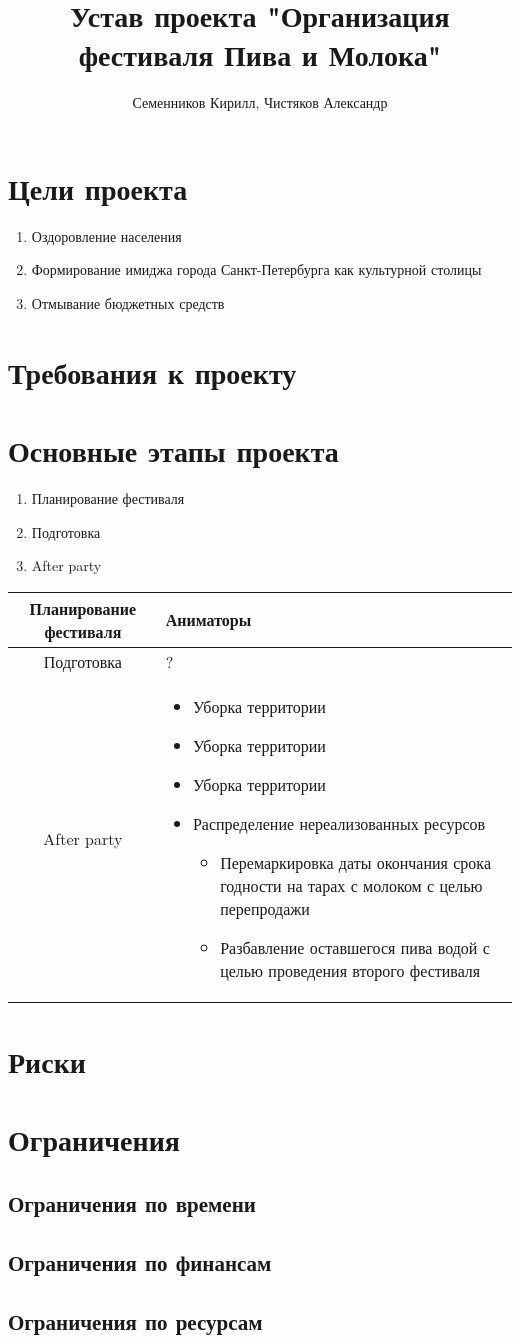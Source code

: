 \documentclass[a4paper,12pt]{article}
\author{Семенников Кирилл, Чистяков Александр}
\title{Устав проекта "Организация фестиваля Пива и Молока"}
\begin{document}
\maketitle
\section{Цели проекта}
\begin{enumerate}
\item{Оздоровление населения}
\item{Формирование имиджа города Санкт-Петербурга как культурной столицы}
\item{Отмывание бюджетных средств}
\end{enumerate}
\section{Требования к проекту}
\section{Основные этапы проекта}

\begin{enumerate}
  \item{Планирование фестиваля}
  \item{Подготовка }
  \item{After party}
\end{enumerate}
\begin{tabular}{|c|p{10cm}|}
  \hline
  Планирование фестиваля & Аниматоры\\
  \hline
  Подготовка & ? \\
  \hline
  After party & 
  \begin{itemize}
    \item{Уборка территории}
    \item{Уборка территории}
    \item{Уборка территории}
    \item Распределение нереализованных ресурсов
      \begin{itemize}
        \item Перемаркировка даты окончания срока годности на тарах с молоком с целью перепродажи
        \item Разбавление оставшегося пива водой с целью проведения второго фестиваля
      \end{itemize}
  \end{itemize}\\
  \hline
\end{tabular}
\section{Риски}
\section{Ограничения}
\subsection{Ограничения по времени}
\subsection{Ограничения по финансам}
\subsection{Ограничения по ресурсам}
\end{document}
